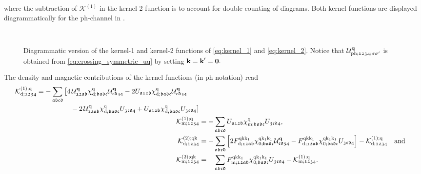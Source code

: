 \documentclass[../../main.tex]{subfiles}
\begin{document}
where the subtraction of $\mathcal{K}^{(1)}$ in the kernel-2 function is to account for double-counting of diagrams. Both kernel functions are displayed diagrammatically for the ph-channel in .
\begin{figure}[ht!]
  \centering
  \parbox{\textwidth}{
    \hspace*{2.8cm}
    \subfloat{}
  }\\[0.5cm]
  \parbox{\textwidth}{
    \hspace*{2.8cm}
    \subfloat{}
  }
  \caption{Diagrammatic version of the kernel-1 and kernel-2 functions of \eqref{eq:kernel_1} and \eqref{eq:kernel_2}. Notice that $\mathcal{U}^{\textbf{q}}_{\text{ph};\mathfrak{1234};\sigma\sigma'}$ is obtained from \eqref{eq:crossing_symmetric_uq} by setting $\textbf{k}=\textbf{k}'=\textbf{0}.$}
  \label{fig:kernel_functions}
\end{figure}
The density and magnetic contributions of the kernel functions (in ph-notation) read
\begin{subequations}
\begin{align}
\begin{split}
	\mathcal{K}^{(1);\text{q}}_{\text{d};\mathfrak{1234}}&=-\sum_{\mathfrak{abcd}}\big [4\,\mathcal{U}^{\textbf{q}}_{\mathfrak{12ab}} \chi^{\text{q}}_{\text{d};\mathfrak{badc}} \mathcal{U}^{\textbf{q}}_{\mathfrak{cd34}} - 2 U_{\mathfrak{a12b}} \chi^{\text{q}}_{\text{d};\mathfrak{badc}} \mathcal{U}^{\textbf{q}}_{\mathfrak{cd34}} \\
	&\qquad\qquad\quad - 2 \,\mathcal{U}^{\textbf{q}}_{\mathfrak{12ab}} \chi^{\text{q}}_{\text{d};\mathfrak{badc}} U_{\mathfrak{3cd4}} + U_{\mathfrak{a12b}} \chi^{\text{q}}_{\text{d};\mathfrak{badc}} U_{\mathfrak{3cd4}}\big ]
\end{split}\\
	\mathcal{K}^{(1);\text{q}}_{\text{m};\mathfrak{1234}}&=-\sum_{\mathfrak{abcd}} U_{\mathfrak{a12b}} \chi^{\text{q}}_{\text{m};\mathfrak{badc}} U_{\mathfrak{3cd4}},\\
	\mathcal{K}^{(2);\text{q}\text{k}}_{\text{d};\mathfrak{1234}}&=- \sum_{\mathfrak{abcd}} \left [2 F^{\text{q}\text{k}\text{k}_1}_{\text{d};\mathfrak{12ab}} \chi^{\text{q}\text{k}_1\text{k}_1}_{0;\mathfrak{badc}} \mathcal{U}^{\textbf{q}}_{\mathfrak{cd34}}  - F^{\text{q}\text{k}\text{k}_1}_{\text{d};\mathfrak{12ab}} \chi^{\text{q}\text{k}_1\text{k}_1}_{0;\mathfrak{badc}} U_{\mathfrak{3cd4}}\right ] - \mathcal{K}^{(1);\text{q}}_{\text{d};\mathfrak{1234}}\quad\text{and}\\
	\mathcal{K}^{(2);\text{q}\text{k}}_{\text{m};\mathfrak{1234}}&=\phantom{-}\sum_{\mathfrak{abcd}} F^{\text{q}\text{k}\text{k}_1}_{\text{m};\mathfrak{12ab}} \chi^{\text{q}\text{k}_1\text{k}_1}_{0;\mathfrak{badc}} U_{\mathfrak{3cd4}} - \mathcal{K}^{(1);\text{q}}_{\text{m};\mathfrak{1234}}.
\end{align}
\end{subequations}
\end{document}
